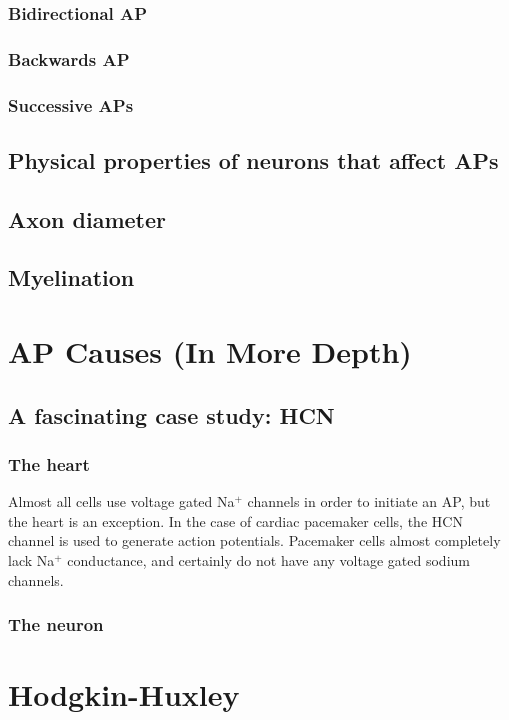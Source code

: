 \documentclass[12pt]{amsart}
\begin{document}
\subsubsection{Bidirectional AP}
\subsubsection{Backwards AP}
\subsubsection{Successive APs}
\subsection{Physical properties of neurons that affect APs}
\subsection{Axon diameter}
\subsection{Myelination}


\section{AP Causes (In More Depth)}
\subsection{A fascinating case study: HCN}
\subsubsection{The heart} Almost all cells use voltage gated Na$^+$ channels in order to initiate an AP, but the heart is an exception. In the case of cardiac pacemaker cells, the HCN channel is used to generate action potentials. Pacemaker cells almost completely lack Na$^+$ conductance, and certainly do not have any voltage gated sodium channels. 

\subsubsection{The neuron}

\section{Hodgkin-Huxley} 
\end{document}
